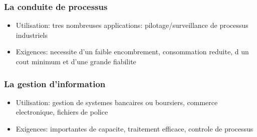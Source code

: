 \documentclass[../main.tex]{subfiles}
\begin{document}
\subsubsection{La conduite de processus}
\begin{itemize}
	\item Utilisation: tres nombreuses applications: pilotage/surveillance de processus industriels\\
	\item Exigences: necessite d'un faible encombrement, consommation reduite, d un cout minimum et d'une grande fiabilite
\end{itemize}
\subsubsection{La gestion d'information}
\begin{itemize}
	\item Utilisation: gestion de systemes bancaires ou boursiers, commerce electronique, fichiers de police\\
	\item Exigences: importantes de capacite, traitement efficace, controle de processus
\end{itemize}
\end{document}
